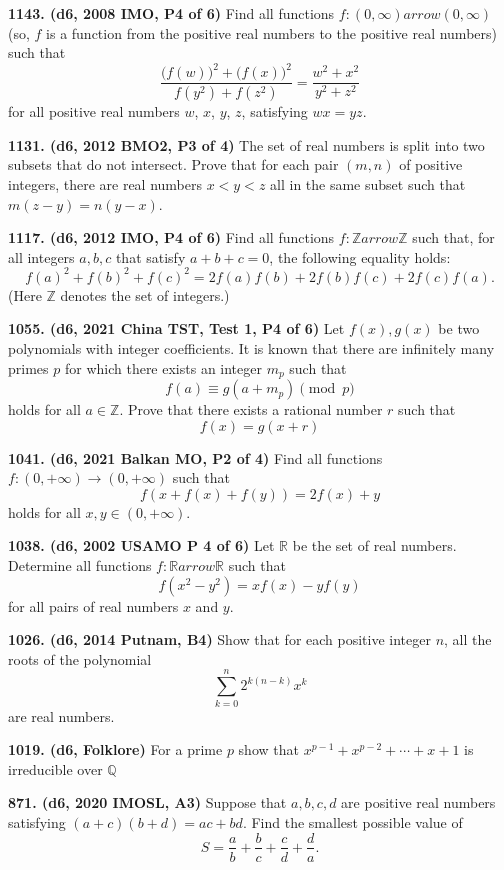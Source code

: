 \documentclass{article}
\begin{document}
\textbf{1143. (\color{red}d6\color{black}, 2008 IMO, P4 of 6)} Find all functions $ f: (0, \infty) arrow (0, \infty)$ (so, $ f$ is a function from the positive real numbers to the positive real numbers) such that \[ \frac {\Big( f(w) \Big)^2 + \Big( f(x) \Big)^2}{f(y^2) + f(z^2) } = \frac {w^2 + x^2}{y^2 + z^2}\] for all positive real numbers \(w\), \(x\), \(y\), \(z\), satisfying $ wx = yz$.

\textbf{1131. (\color{red}d6\color{black}, 2012 BMO2, P3 of 4)} The set of real numbers is split into two subsets that do not intersect. Prove that for each pair $(m,n)$ of positive integers, there are real numbers $x<y<z$ all in the same subset such that $m(z-y)=n(y-x)$.

\textbf{1117. (\color{red}d6\color{black}, 2012 IMO, P4 of 6)} Find all functions $f:\mathbb Zarrow \mathbb Z$ such that, for all integers $a,b,c$ that satisfy $a+b+c=0$, the following equality holds:
\[f(a)^2+f(b)^2+f(c)^2=2f(a)f(b)+2f(b)f(c)+2f(c)f(a).\]
(Here $\mathbb{Z}$ denotes the set of integers.)

\textbf{1055. (\color{red}d6\color{black}, 2021 China TST, Test 1, P4 of 6)} Let $f(x), g(x)$ be two polynomials with integer coefficients. It is known that there are infinitely many primes $p$ for which there exists an integer $m_{p}$ such that
$$
    f(a) \equiv g(a+m_{p}) \pmod p
$$
holds for all $a \in \mathbb{Z}$. Prove that there exists a rational number $r$ such that
$$
    f(x)=g(x+r)
$$

\textbf{1041. (\color{red}d6\color{black}, 2021 Balkan MO, P2 of 4)} Find all functions \(f : (0, +\infty) \to (0, +\infty)\) such that \[f(x+f(x) + f(y)) = 2f(x) + y\] holds for all \(x,y \in (0, +\infty)\).

\textbf{1038. (\color{red}d6\color{black}, 2002 USAMO P 4 of 6)} Let $\mathbb{R}$ be the set of real numbers. Determine all functions $f : \mathbb{R} arrow \mathbb{R}$ such that \[f(x^2 - y^2) = xf(x) - yf(y)\] for all pairs of real numbers $x$ and $y$.

\textbf{1026. (\color{red}d6\color{black}, 2014 Putnam, B4)} Show that for each positive integer $n$, all the roots of the polynomial
\[ \sum_{k=0}^n 2^{k(n-k)} x^k \]
are real numbers.

\textbf{1019. (\color{red}d6\color{black}, Folklore)} For a prime $p$ show that $x^{p-1}+x^{p-2}+\cdots+x+1$ is irreducible over $\mathbb{Q}$

\textbf{871. (\color{red}d6\color{black}, 2020 IMOSL, A3)} Suppose that $a, b, c, d$ are positive real numbers satisfying $(a+c)(b+d)=a c+b d$. Find the smallest possible value of
$$
    S=\frac{a}{b}+\frac{b}{c}+\frac{c}{d}+\frac{d}{a}.
$$
\end{document}
